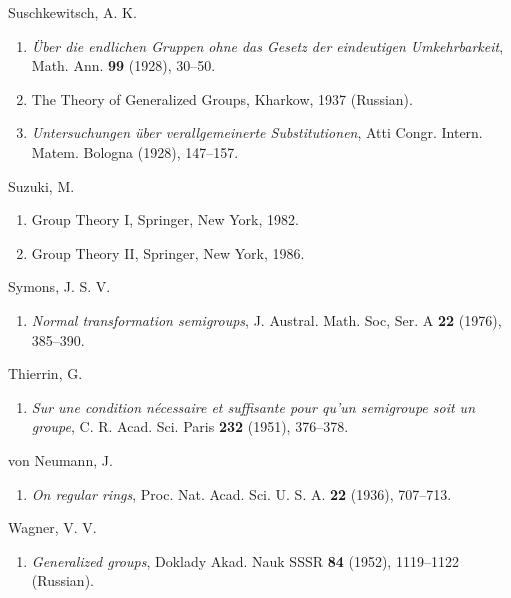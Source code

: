 \documentclass{surv-l}
\numberwithin{equation}{section}
\numberwithin{table}{section}
\numberwithin{figure}{section}
\theoremstyle{plain}
\theoremstyle{definition}
\begin{document}
\begin{thebibliography}{}
\item[] Suschkewitsch, A. K.
\begin{enumerate}
\item \label{bib73} \emph{\"{U}ber die endlichen Gruppen ohne das
Gesetz der eindeutigen Umkehrbarkeit}, Math. Ann.
\textbf{99} (1928), 30--50.

\item \label{bib73a} The Theory of Generalized Groups, Kharkow, 1937
(Russian).

\item \label{bib73b} \emph{Untersuchungen \"{u}ber verallgemeinerte
Substitutionen}, Atti Congr. Intern. Matem. Bologna
(1928), 147--157.
\end{enumerate}

\item[] Suzuki, M.
\begin{enumerate}
\item \label{bib74} Group Theory I, Springer, New York, 1982.

\item \label{bib74a} Group Theory II, Springer, New York, 1986.
\end{enumerate}

\item[] Symons, J. S. V.
\begin{enumerate}
\item \label{bib75} \emph{Normal transformation semigroups}, J. Austral.
Math. Soc, Ser. A \textbf{22} (1976), 385--390.
\end{enumerate}

\item[] Thierrin, G.
\begin{enumerate}
\item \label{bib76} \emph{Sur une condition n\'{e}cessaire et suffisante
pour qu'un semigroupe soit un groupe}, C. R. Acad. Sci.
Paris \textbf{232} (1951), 376--378.
\end{enumerate}

\item[] von Neumann, J.
\begin{enumerate}
\item \label{bib77} \emph{On regular rings}, Proc. Nat. Acad. Sci. U. S.
A. \textbf{22} (1936), 707--713.
\end{enumerate}

\item[] Wagner, V. V.
\begin{enumerate}
\item \label{bib78} \emph{Generalized groups}, Doklady Akad. Nauk SSSR \textbf{84}
(1952), 1119--1122 (Russian).
\end{enumerate}


\end{thebibliography}
\end{document}
